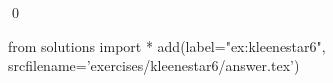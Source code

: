 
\begin{ex} 
  \label{ex:kleenestar6}
  
  \qed
\end{ex} 
\begin{python0}
from solutions import *
add(label="ex:kleenestar6",
    srcfilename='exercises/kleenestar6/answer.tex') 
\end{python0}
